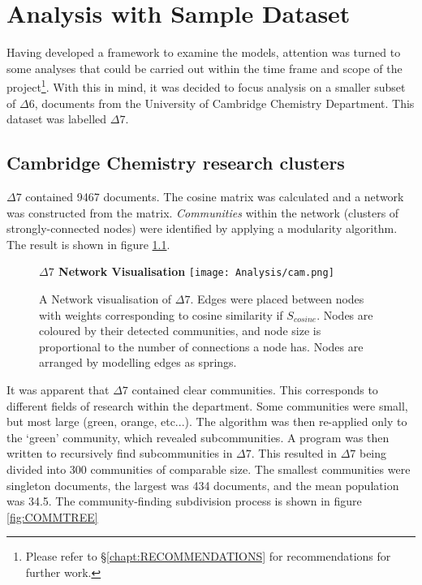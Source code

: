 \chapter{Analysis with Sample Dataset}
\label{chapt:ANALYSIS}
Having developed a framework to examine the models, attention was turned to some analyses that could be carried out within the time frame and scope of the project\footnote{Please refer to  \S\ref{chapt:RECOMMENDATIONS} for recommendations for further work.}. With this in mind, it was decided to focus analysis on a smaller subset of $\Delta6$, documents from the University of Cambridge Chemistry Department. This dataset was labelled $\Delta7$.
\section{Cambridge Chemistry research clusters}
\label{sec:RESEARCHCLUSTERS}
$\Delta7$ contained 9467 documents. The cosine matrix was calculated and a network was constructed from the matrix. \emph{Communities} within the network (clusters of strongly-connected nodes) were identified by applying a modularity algorithm\cite{modularity1}\cite{modularity2}. The result is shown in figure \ref{fig:CAMCOMMUNITIES}.
\begin{center}
\begin{figure}[H]
  \centering
  \textbf{$\Delta7$ Network Visualisation}
    \texttt{[image: Analysis/cam.png]}
    \caption[Network Visualisation of University of Cambridge Chemistry Department Documents]{A Network visualisation of  $\Delta7$. Edges were placed between nodes with weights corresponding to cosine similarity if $S_{cosine}$. Nodes are coloured by their detected communities, and node size is proportional to the number of connections a node has. Nodes are arranged by modelling edges as springs.}
    \label{fig:CAMCOMMUNITIES}

\end{figure} 
\end{center}
It was apparent that $\Delta7$ contained clear communities. This corresponds to different fields of research within the department. Some communities were small, but most large (green, orange, etc...). The algorithm was then re-applied only to the `green' community, which revealed subcommunities. A program was then written to recursively find subcommunities in $\Delta7$. This resulted in $\Delta7$ being divided into 300 communities of comparable size. The smallest communities were singleton documents, the largest was 434 documents, and the mean population was 34.5. The community-finding subdivision process is shown in figure \ref{fig:COMMTREE}
